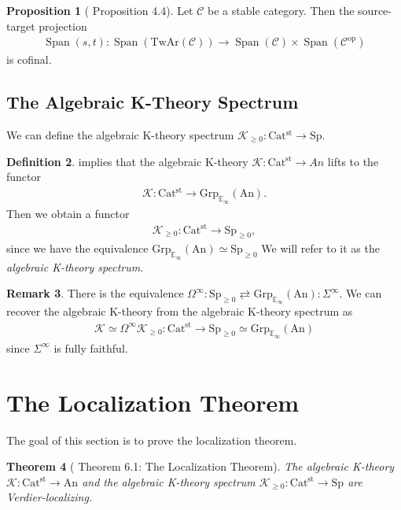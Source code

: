 \documentclass[a4paper,dvipdfmx,11pt,reqno]{amsart}
\DeclareMathOperator{\myop}{op}
\newcommand{\C}{\mathcal{C}}
\newcommand{\K}{\mathcal{K}}
\DeclareMathOperator{\Span}{Span}
\newcommand{\An}{\mathrm{An}}
\newcommand{\Catst}{\mathrm{Cat^{st}}}
\newcommand{\Grp}{\mathrm{Grp}_{\mathbb{E}_{\infty}}}
\newcommand{\TwAr}{\mathrm{TwAr}}
\newcommand{\Sp}{\mathrm{Sp}}
\newtheorem{theorem}{Theorem}[section]
\theoremstyle{definition}
\newtheorem{definition}[theorem]{Definition}
\newtheorem{proposition}[theorem]{Proposition}
\newtheorem{remark}[theorem]{Remark}
\begin{document}
\begin{proposition}[\cite{HLS23} Proposition 4.4] \label{HLS23.prop.4.4}
  Let $\C$ be a stable category.
  Then the source-target projection 
  \begin{align*}
    \Span(s,t) : \Span(\TwAr(\C)) \to \Span(\C) \times \Span(\C^{\myop})
  \end{align*}
  is cofinal.
\end{proposition}

\subsection{The Algebraic K-Theory Spectrum}

We can define the algebraic K-theory spectrum $\K_{\geq 0} : \Catst \to \Sp$.

\begin{definition}
   implies that the algebraic K-theory $\K : \Catst \to An$ lifts to the functor 
  \begin{align*}
    \K : \Catst \to \Grp(\An).
  \end{align*}
  Then we obtain a functor 
  \begin{align*}
    \K_{\geq 0} : \Catst \to \Sp_{\geq 0},
  \end{align*}
  since we have the equivalence $\Grp(\An) \simeq \Sp_{\geq 0}$
  We will refer to it as the \textit{algebraic K-theory spectrum}.
\end{definition}

\begin{remark}
  There is the equivalence $\Omega^\infty : \Sp_{\geq 0} \rightleftarrows \Grp(\An) : \Sigma^\infty$.
  We can recover the algebraic K-theory from the algebraic K-theory spectrum as 
  \begin{align*}
    \K \simeq \Omega^\infty \K_{\geq 0} : \Catst \to \Sp_{\geq 0} \simeq \Grp(\An) 
  \end{align*}
  since $\Sigma^\infty$ is fully faithful.
\end{remark}


\section{The Localization Theorem}

The goal of this section is to prove the localization theorem.

\begin{theorem}[\cite{HLS23} Theorem 6.1: The Localization Theorem] \label{thrm.localization_theorem}
  The algebraic K-theory $\K : \Catst \to \An$ and the algebraic K-theory spectrum $\K_{\geq 0} : \Catst \to \Sp$ are Verdier-localizing.
\end{theorem}
\end{document}
